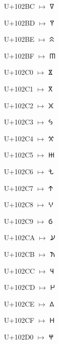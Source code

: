 {\noindent U+102BC $\mapsto$ {\cafont 𐊼}\par
\noindent U+102BD $\mapsto$ {\cafont 𐊽}\par
\noindent U+102BE $\mapsto$ {\cafont 𐊾}\par
\noindent U+102BF $\mapsto$ {\cafont 𐊿}\par
\noindent U+102C0 $\mapsto$ {\cafont 𐋀}\par
\noindent U+102C1 $\mapsto$ {\cafont 𐋁}\par
\noindent U+102C2 $\mapsto$ {\cafont 𐋂}\par
\noindent U+102C3 $\mapsto$ {\cafont 𐋃}\par
\noindent U+102C4 $\mapsto$ {\cafont 𐋄}\par
\noindent U+102C5 $\mapsto$ {\cafont 𐋅}\par
\noindent U+102C6 $\mapsto$ {\cafont 𐋆}\par
\noindent U+102C7 $\mapsto$ {\cafont 𐋇}\par
\noindent U+102C8 $\mapsto$ {\cafont 𐋈}\par
\noindent U+102C9 $\mapsto$ {\cafont 𐋉}\par
\noindent U+102CA $\mapsto$ {\cafont 𐋊}\par
\noindent U+102CB $\mapsto$ {\cafont 𐋋}\par
\noindent U+102CC $\mapsto$ {\cafont 𐋌}\par
\noindent U+102CD $\mapsto$ {\cafont 𐋍}\par
\noindent U+102CE $\mapsto$ {\cafont 𐋎}\par
\noindent U+102CF $\mapsto$ {\cafont 𐋏}\par
\noindent U+102D0 $\mapsto$ {\cafont 𐋐}\par
}

